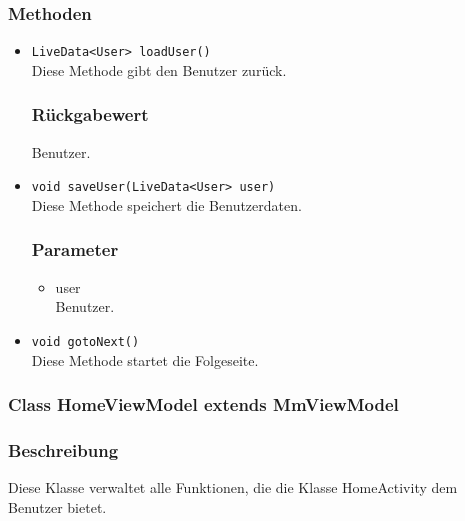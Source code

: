 \documentclass[a4paper]{scrreprt}
\begin{document}
\subsubsection*{Methoden}
\begin{addmargin}[25pt]{0pt}
\begin{itemize}


\item \texttt{LiveData<User> loadUser()}\\
	Diese Methode gibt den Benutzer zurück.

	\subsubsection*{Rückgabewert}
	Benutzer.

\item \texttt{void saveUser(LiveData<User> user)}\\
	Diese Methode speichert die Benutzerdaten.

	\subsubsection*{Parameter}
	\begin{itemize}
	\item user \\
		Benutzer.
	\end{itemize}
	
\item \texttt{void gotoNext()}\\
	Diese Methode startet die Folgeseite.
	
\end{itemize}
\end{addmargin}


\subsubsection{Class HomeViewModel extends MmViewModel}
\subsubsection*{Beschreibung}
Diese Klasse verwaltet alle Funktionen, die die Klasse HomeActivity dem Benutzer bietet.
\end{document}
